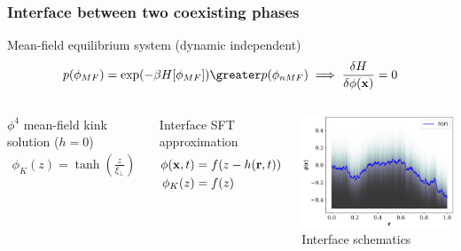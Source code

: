 \documentclass[9pt, dvipsnames,aspectratio=169]{beamer} %
\newcommand{\bx}{{\bf x}} %
\newcommand{\br}{{\bf r}}
\begin{document}
\begin{frame}
	\frametitle{Interface between two coexisting phases}
	\begin{block}{Mean-field equilibrium system (dynamic independent)}
		\begin{align}
			p(\phi_{MF}) = \exp(-\beta H[\phi_{MF}]) \greater p(\phi_{nMF}) \implies \frac{\delta H}{\delta \phi(\bx)} = 0 
		\end{align}
	\end{block}
	\begin{columns}
    \begin{block}{$\phi^4$ mean-field kink solution ($h=0$)}
        \begin{align}
            \phi_K(z) = \tanh \left( \frac{z}{\xi_\perp} \right)
        \end{align}
    \end{block}	
	\begin{block}{Interface SFT approximation}
        \begin{align}
            \phi(\bx,t) &= f(z-h(\br,t)) \\
            \phi_K(z) &= f(z) 
        \end{align}
    \end{block}
    	\centering
		\includegraphics[width=\linewidth]{interface-profil.pdf}
		Interface schematics
	\end{columns}    
\end{frame}
\end{document}

